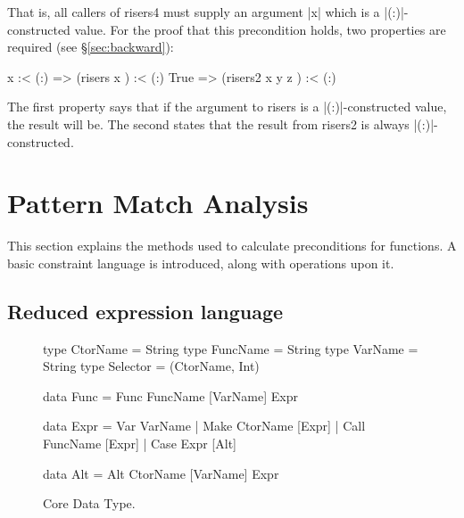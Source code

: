 \documentclass[preprint]{sigplanconf}
\newcommand{\C}[1]{\textsf{#1}}
\begin{document}
\noindent That is, all callers of \C{risers4} must supply an argument |x| which is a |(:)|-constructed value. For the proof that this precondition holds, two properties are required (see \S\ref{sec:backward}):

\ignore\begin{code}
x :< (:)  => (risers x       ) :< (:)
True      => (risers2 x y z  ) :< (:)
\end{code}

\noindent The first property says that if the argument to \C{risers} is a |(:)|-constructed value, the result will be. The second states that the result from \C{risers2} is always |(:)|-constructed.

\section{Pattern Match Analysis}
\label{sec:manipulate}

This section explains the methods used to calculate preconditions for functions. A basic constraint language is introduced, along with operations upon it.

\subsection{Reduced expression language}
\label{sec:core}

\begin{figure}
\begin{code}
type CtorName  =  String
type FuncName  =  String
type VarName   =  String
type Selector  =  (CtorName, Int)

data Func  =  Func FuncName [VarName] Expr

data Expr  =  Var   VarName
           |  Make  CtorName  [Expr]
           |  Call  FuncName  [Expr]
           |  Case  Expr      [Alt]

data Alt   =  Alt CtorName [VarName] Expr
\end{code}
\caption{Core Data Type.}
\label{fig:core}
\end{figure}
\end{document}
